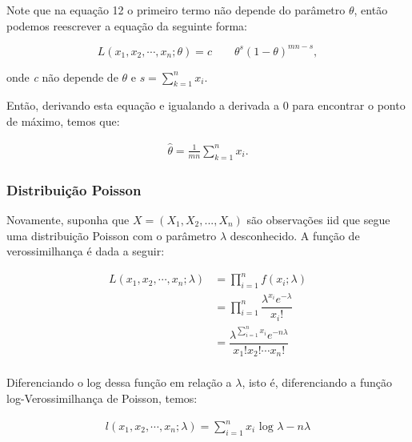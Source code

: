 Note que na equação 12 o primeiro termo não depende do parâmetro \begin{math}
\theta \end{math}, então podemos reescrever a equação da seguinte forma:

\begin{equation}
       L(x_1, x_2, \cdots, x_n; \theta)= c \qquad \theta^{s} (1-\theta)^{mn-s},
\end{equation}

onde \emph{c} não depende de \begin{math} \theta \end{math} e \begin{math} s =
\sum_{k=1}^n x_i.
\end{math}

Então, derivando esta equação e igualando a derivada a 0 para encontrar o ponto de máximo, temos que:

\begin{align}
       \hat{\theta}= \frac{1}{mn}\sum_{k=1}^n x_i.
\end{align}

\subsubsection{Distribuição Poisson}

Novamente, suponha que \begin{math} X = (X_1, X_2, ..., X_n) \end{math} são observações iid que segue uma distribuição Poisson com o parâmetro \begin{math} \lambda \end{math} desconhecido. A função de verossimilhança é dada a seguir:

\begin{align}
L(x_1, x_2, \cdots, x_n; \lambda) &= \prod\limits_{i=1}^n f(x_i;\lambda) \\ &= \prod\limits_{i=1}^n \dfrac{\lambda^{x_i}e^{-\lambda}}{x_i!}\\ &= \dfrac{\lambda^{\sum\limits^n_{i=1}x_i} e^{-n\lambda}}{x_1!x_2! \cdots x_n!}\\ 
\end{align}

Diferenciando o log dessa função em relação a \begin{math} \lambda \end{math}, isto é, diferenciando a função log-Verossimilhança de Poisson, temos:

\begin{align}
	l(x_1, x_2, \cdots, x_n; \lambda)=\sum\limits^n_{i=1}x_i \text{ log }\lambda-n\lambda
\end{align}

